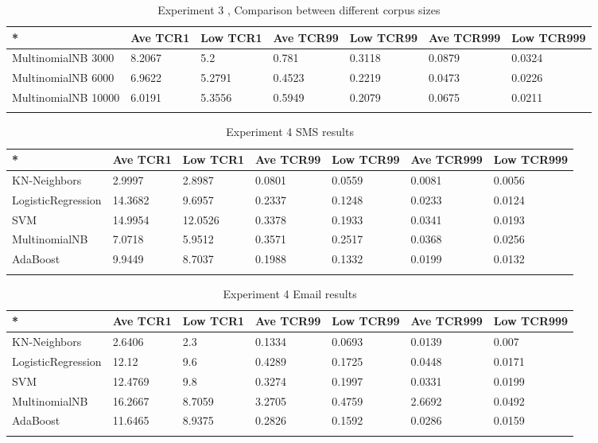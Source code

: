 \documentclass[11pt,a4paper]{article}
\begin{document}
\begin{table}[t!]
\centering
\begin{tabular}{lllllll}
 *& Ave TCR1 &Low TCR1&Ave TCR99&Low TCR99&Ave TCR999&Low TCR999\\
  \hline
MultinomialNB 3000& 8.2067&	5.2	&0.781&	0.3118&	0.0879&	0.0324	\\
MultinomialNB 6000&6.9622&	5.2791&	0.4523&	0.2219&	0.0473&	0.0226	\\
MultinomialNB 10000& 6.0191	&5.3556&	0.5949&	0.2079&	0.0675&	0.0211	\\

 \\
\end{tabular}
\caption{Experiment 3 , Comparison between different corpus sizes}
\end{table}

\begin{table}[t!]
\centering
\begin{tabular}{lllllll}
 *& Ave TCR1 &Low TCR1&Ave TCR99&Low TCR99&Ave TCR999&Low TCR999\\
  \hline
  KN-Neighbors& 2.9997	&2.8987&	0.0801	&0.0559&	0.0081&	0.0056	\\
LogisticRegression& 14.3682	&9.6957&	0.2337	&0.1248&	0.0233&	0.0124	\\
SVM& 14.9954&	12.0526	&0.3378	&0.1933&	0.0341&	0.0193	\\
MultinomialNB &7.0718&	5.9512&	0.3571&	0.2517&	0.0368&	0.0256	\\
AdaBoost& 9.9449&	8.7037&	0.1988&	0.1332&	0.0199&	0.0132	\\

 \\
\end{tabular}
\caption{Experiment 4 SMS results}
\end{table}

\begin{table}[t!]
\centering
\begin{tabular}{lllllll}
 *& Ave TCR1 &Low TCR1&Ave TCR99&Low TCR99&Ave TCR999&Low TCR999\\
  \hline
  KN-Neighbors& 2.6406&	2.3	&0.1334&	0.0693&	0.0139&	0.007	\\
LogisticRegression& 12.12&	9.6&	0.4289&	0.1725&	0.0448&	0.0171	\\
SVM& 12.4769&	9.8&	0.3274&	0.1997&	0.0331	&0.0199	\\
MultinomialNB &16.2667&	8.7059&	3.2705&	0.4759&	2.6692&	0.0492	\\
AdaBoost& 11.6465&	8.9375&	0.2826&	0.1592&	0.0286&	0.0159	\\

 \\
\end{tabular}
\caption{Experiment 4 Email results}
\end{table}
\end{document}
